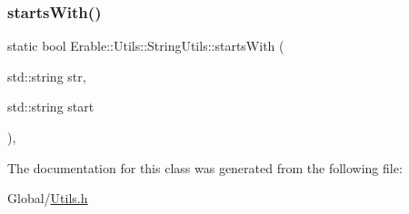 \subsubsection{\texorpdfstring{startsWith()}{startsWith()}}
{\footnotesize\ttfamily static bool Erable\+::\+Utils\+::\+String\+Utils\+::starts\+With (\begin{DoxyParamCaption}\item[{std\+::string}]{str,  }\item[{std\+::string}]{start }\end{DoxyParamCaption})\hspace{0.3cm}{\ttfamily [inline]}, {\ttfamily [static]}}



The documentation for this class was generated from the following file\+:\begin{DoxyCompactItemize}
\item 
Global/\mbox{\hyperlink{_utils_8h}{Utils.\+h}}\end{DoxyCompactItemize}
